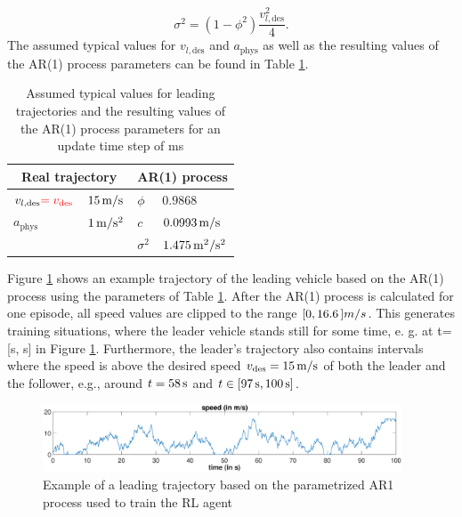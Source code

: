 \documentclass[review]{elsarticle}
\providecommand{\red}[1]{\textcolor{red}{#1}}
\providecommand{\martin}[1]{\red{#1}} %
\providecommand{\sub}[1]{_{\mathrm{#1}}}  %
\providecommand{\3}{{\ss}}
\begin{document}
\begin{equation}
\sigma^2=(1-\phi^2)\frac{v_{l,\text{des}}^2}{4}.
\end{equation}
The assumed typical values for $v_{l,\text{des}}$ and  $a\sub{phys}$ as well as the resulting values of the AR(1) process parameters can be found in Table \ref{tab:AR1Parameters}.
%
\begin{table}
	\caption{Assumed typical values for leading trajectories and
		the resulting values of the AR(1) process parameters for an
		update time step of \unit[100]{ms}} 
	\label{tab:AR1Parameters} 
	\begin{center}
		\begin{tabular}{ p{} p{} |p{} p{}  }
			\multicolumn{2}{c|}{Real trajectory} & \multicolumn{2}{c}{AR(1) process}   \\ \hline
			$v_{l,\text{des}}\martin{=v\sub{des}}$ &$\unit[15]{m/s}$ &$\phi$ & $0.9868$\\
			$a\sub{phys}$ &$\unit[1]{m/s^2}$ &$c$ & $\unit[0.0993]{m/s}$\\
			& & $\sigma^2$ & $\unit[1.475]{m^2/s^2}$
			
		\end{tabular}
	\end{center}
\end{table}
%
Figure \ref{fig:AR1process} shows an example trajectory of the leading
vehicle based on the AR(1) process using the parameters of Table
\ref{tab:AR1Parameters}. After the AR(1) process is calculated for one
episode, all speed values are clipped to the range $\unit[[0, 16.6]]{m/s}$. This generates
training situations, where the leader vehicle stands still for some
time, e. g. at t= [\unit[48]{s}, \unit[50]{s}] in Figure
\ref{fig:AR1process}. Furthermore, the leader's trajectory
  also contains intervals where the speed is above the desired speed
  $v\sub{des}=\unit[15]{m/s}$ of both the leader and the follower,
  e.g., around $t=\unit[58]{s}$ and $t\in [\unit[97]{s},
    \unit[100]{s}]$.
  
\begin{figure}
	\centering
	\includegraphics[width=0.95\textwidth]{images/AR1process}
	\caption{Example of a leading trajectory based on the parametrized AR1 process used to train the RL agent}
	\label{fig:AR1process}
\end{figure}
%
%
%
\end{document}
